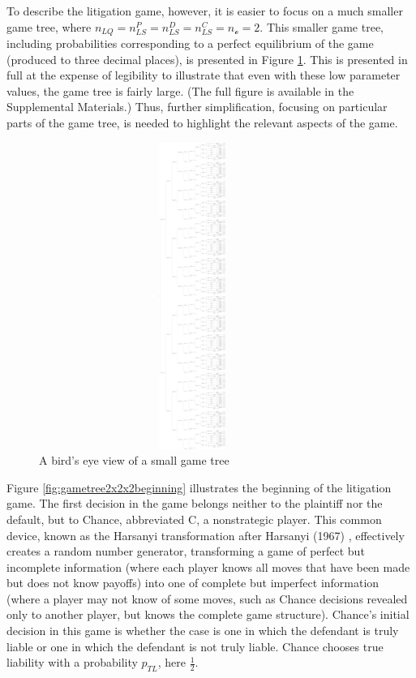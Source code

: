 \documentclass{article}
\begin{document}
To describe the litigation game, however, it is easier to focus on a much smaller game tree, where $n_{LQ}=n_{LS}^P=n_{LS}^D=n_{LS}^C=n_{\mathcal{o}}=2$. This smaller game tree, including probabilities corresponding to a perfect equilibrium of the game (produced to three decimal places), is presented in Figure \ref{fig:gametree2x2x2}. This is presented in full at the expense of legibility to illustrate that even with these low parameter values, the game tree is fairly large. (The full figure is available in the Supplemental Materials.) Thus, further simplification, focusing on particular parts of the game tree, is needed to highlight the relevant aspects of the game.
\begin{figure}[h!]
\centering
\includegraphics[width=10cm, height=10cm, trim={0in 0in 0in 0in}, clip]{../Figures/game tree 2x2x2.pdf}
\caption{A bird's eye view of a small game tree}
\label{fig:gametree2x2x2}
\end{figure}

Figure \ref{fig:gametree2x2x2beginning} illustrates the beginning of the litigation game. The first decision in the game belongs neither to the plaintiff nor the default, but to Chance, abbreviated C, a nonstrategic player. This common device, known as the Harsanyi transformation after Harsanyi (1967) \cite{harsanyi}, effectively creates a random number generator, transforming a game of perfect but incomplete information (where each player knows all moves that have been made but does not know payoffs) into one of complete but imperfect information (where a player may not know of some moves, such as Chance decisions revealed only to another player, but knows the complete game structure). Chance's initial decision in this game is whether the case is one in which the defendant is truly liable or one in which the defendant is not truly liable. Chance chooses true liability with a probability $p_{TL}$, here $\frac{1}{2}$. 
\end{document}
